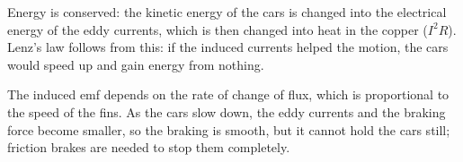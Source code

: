 \documentclass[12pt]{article}
\begin{document}
Energy is conserved: the kinetic energy of the cars is changed into the electrical energy of the eddy
currents, which is then changed into heat in the copper ($I^2R$). Lenz's law follows from this: if the
induced currents helped the motion, the cars would speed up and gain energy from nothing.

The induced emf depends on the rate of change of flux, which is proportional to the speed of the fins.
As the cars slow down, the eddy currents and the braking force become smaller, so the braking is smooth,
but it cannot hold the cars still; friction brakes are needed to stop them completely.
\end{document}
